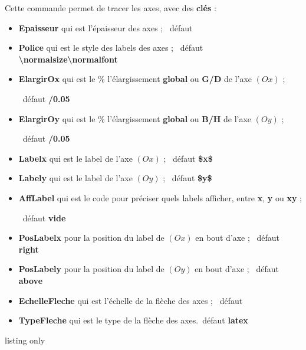 \documentclass[a4paper,french,11pt]{article}
\newcommand\cmaj[1]{%
	{\tcbox[vignetteMaJ]{#1}\xspace}%
}
\newcommand\Cle[1]{{\bfseries\sffamily\textlangle #1\textrangle}}
\begin{document}
\begin{cautionblock}
Cette commande permet de tracer les axes, avec des \Cle{clés} :

\begin{itemize}
	\item \Cle{Epaisseur} qui est l'épaisseur des axes ; \hfill~défaut \Cle{1pt}
	\item \Cle{Police} qui est le style des labels des axes  ; \hfill~défaut \Cle{\textbackslash{}normalsize\textbackslash{}normalfont}
	\item \cmaj{2.1.2} \Cle{ElargirOx} qui est le \% l'élargissement \Cle{global} ou \Cle{G/D} de l'axe $(Ox)$ ;
	
	\hfill~défaut \Cle{0/0.05}
	\item \cmaj{2.1.2} \Cle{ElargirOy} qui est le \% l'élargissement \Cle{global} ou \Cle{B/H} de l'axe $(Oy)$ ;
	
	\hfill~défaut \Cle{0/0.05}
	\item \Cle{Labelx} qui est le label de l'axe $(Ox)$ ; \hfill~défaut \Cle{\${}x\$}
	\item \Cle{Labely} qui est le label de l'axe $(Oy)$ ; \hfill~défaut \Cle{\${}y\$}
	\item \Cle{AffLabel} qui est le code pour préciser quels labels afficher, entre \Cle{x}, \Cle{y} ou \Cle{xy} ;
	
	\hfill~défaut \Cle{vide}
	\item \Cle{PosLabelx} pour la position du label de $(Ox)$ en bout d'axe ; \hfill~défaut \Cle{right}
	\item \Cle{PosLabely} pour la position du label de $(Oy)$ en bout d'axe ; \hfill~défaut \Cle{above}
	\item \Cle{EchelleFleche} qui est l'échelle de la flèche des axes ; \hfill~défaut \Cle{1}
	\item \Cle{TypeFleche} qui est le type de la flèche des axes.\hfill~défaut \Cle{latex}
\end{itemize}
\vspace*{-\baselineskip}\leavevmode
\end{cautionblock}

\begin{PresCodeTexPL}{listing only}
\AxesTikz

\AxesTikz%
	[AffLabel=xy,Labelx={Nombre de jours},Labely={Nombre d'individus infectés, en centaines},%
	PosLabelx={above left},PosLabely={above right},%
	Police=\small\sffamily,ElargirOx=0,ElargirOy=0]
\end{PresCodeTexPL}
\end{document}
